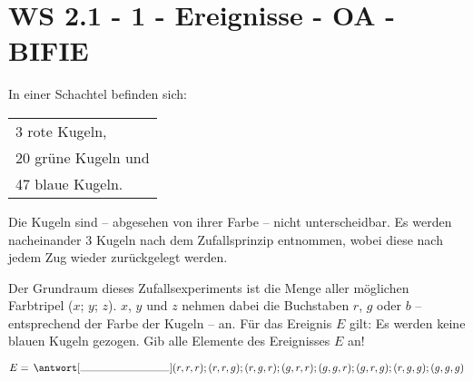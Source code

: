 \section{WS 2.1 - 1 - Ereignisse - OA - BIFIE}


\begin{beispiel}[WS 2.1]{1} %
In einer Schachtel befinden sich:

\hspace{4cm}\begin{tabular}{l}
3 rote Kugeln, \\
20 grüne Kugeln und \\
47 blaue Kugeln. \\
\end{tabular}

Die Kugeln sind -- abgesehen von ihrer Farbe -- nicht unterscheidbar.
Es werden nacheinander 3 Kugeln nach dem Zufallsprinzip entnommen, wobei diese nach
jedem Zug wieder zurückgelegt werden. 

\leer

Der Grundraum dieses Zufallsexperiments ist die Menge aller möglichen Farbtripel ($x$; $y$; $z$).
$x$, $y$ und $z$ nehmen dabei die Buchstaben $r$, $g$ oder $b$ -- entsprechend der Farbe der Kugeln -- an. Für das Ereignis $E$ gilt: Es werden keine blauen Kugeln gezogen.
Gib alle Elemente des Ereignisses $E$ an! 


\leer

$E=\,\antwort[\rule{3cm}{0.3pt}]{(r,r,r);(r,r,g);(r,g,r);(g,r,r);(g,g,r);(g,r,g);(r,g,g);(g,g,g)}$
\end{beispiel}